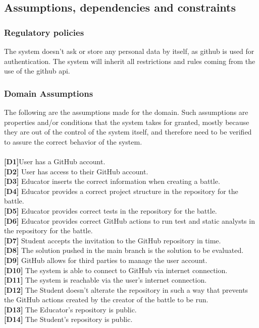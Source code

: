 \documentclass{article}
\begin{document}
\subsection{Assumptions, dependencies and constraints}
\subsubsection{Regulatory policies}
The system doesn’t ask or store any personal data by itself, as github is used for authentication. The system will inherit all restrictions and rules coming from the use of the github api.
\subsubsection{Domain Assumptions}
The following are the assumptions made for the domain. Such assumptions are
properties and/or conditions that the system takes for granted, mostly because they
are out of the control of the system itself, and therefore need to be verified to assure the correct behavior of the system.\\\\
\textbf{[D1]}User has a GitHub account.\\
\textbf{[D2]} User has access to their GitHub account.\\
\textbf{[D3]} Educator inserts the correct information when creating a battle.\\
\textbf{[D4]} Educator provides a correct project structure in the repository for the battle.\\
\textbf{[D5]} Educator provides correct tests in the repository for the battle.\\
\textbf{[D6]} Educator provides correct GitHub actions to run test and static analysts in the repository for the battle.\\
\textbf{[D7]} Student accepts the invitation to the GitHub repository in time.\\
\textbf{[D8]} The solution pushed in the main branch is the solution to be evaluated.\\
\textbf{[D9]} GitHub allows for third parties to manage the user account.\\
\textbf{[D10]} The system is able to connect to GitHub via internet connection.\\
\textbf{[D11]} The system is reachable via the user’s internet connection.\\
\textbf{[D12]} The Student doesn't alterate the repository in such a way that prevents the GitHub actions created by the creator of the battle to be run.\\
\textbf{[D13]} The Educator’s repository is public.\\
\textbf{[D14]} The Student’s repository is public.\\
\end{document}
